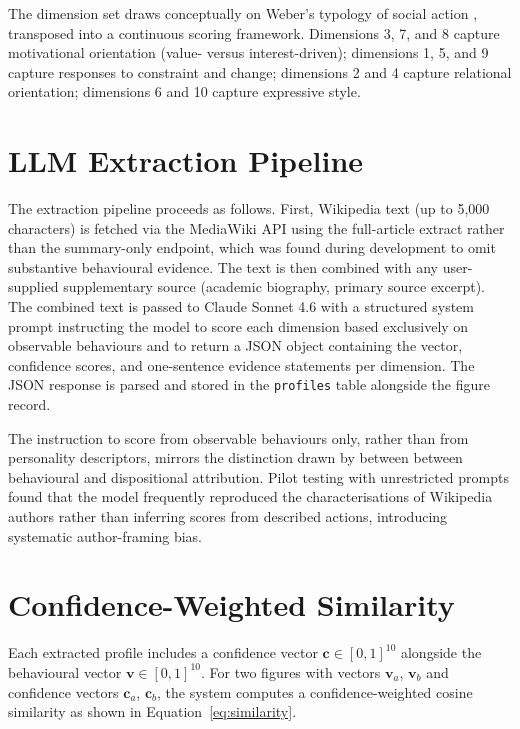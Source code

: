 \documentclass[11pt, a4paper]{report}
\begin{document}
The dimension set draws conceptually on Weber's typology of social action \citep{weber1922}, transposed into a continuous scoring framework. Dimensions 3, 7, and 8 capture motivational orientation (value- versus interest-driven); dimensions 1, 5, and 9 capture responses to constraint and change; dimensions 2 and 4 capture relational orientation; dimensions 6 and 10 capture expressive style.

\section{LLM Extraction Pipeline}

The extraction pipeline proceeds as follows. First, Wikipedia text (up to 5,000 characters) is fetched via the MediaWiki API using the full-article extract rather than the summary-only endpoint, which was found during development to omit substantive behavioural evidence. The text is then combined with any user-supplied supplementary source (academic biography, primary source excerpt). The combined text is passed to Claude Sonnet 4.6 with a structured system prompt instructing the model to score each dimension based exclusively on observable behaviours and to return a JSON object containing the vector, confidence scores, and one-sentence evidence statements per dimension. The JSON response is parsed and stored in the \texttt{profiles} table alongside the figure record.

The instruction to score from observable behaviours only, rather than from personality descriptors, mirrors the distinction drawn by \citet{ross1977} between between behavioural and dispositional attribution. Pilot testing with unrestricted prompts found that the model frequently reproduced the characterisations of Wikipedia authors rather than inferring scores from described actions, introducing systematic author-framing bias.

\section{Confidence-Weighted Similarity}

Each extracted profile includes a confidence vector $\mathbf{c} \in [0,1]^{10}$ alongside the behavioural vector $\mathbf{v} \in [0,1]^{10}$. For two figures with vectors $\mathbf{v}_a$, $\mathbf{v}_b$ and confidence vectors $\mathbf{c}_a$, $\mathbf{c}_b$, the system computes a confidence-weighted cosine similarity as shown in Equation~\ref{eq:similarity}.
\end{document}
